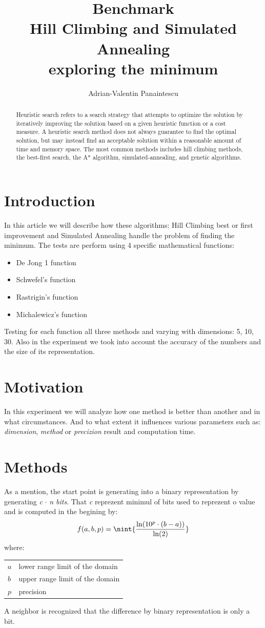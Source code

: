 \documentclass{article}
\author{Adrian-Valentin Panaintescu}
\title{Benchmark\\Hill Climbing and Simulated Annealing\\exploring the minimum}
\makeatletter
\newenvironment{conditions}
  {\par\vspace{\abovedisplayskip}\noindent\begin{tabular}{>{$}l<{$} @{${}={}$} l}}
  {\end{tabular}\par\vspace{\belowdisplayskip}}
\DeclarePairedDelimiter{\nint}\lfloor\rceil
\newcommand{\lnb}[1]{%
  \ln\mleft(#1\mright)%
}
\makeatother
\begin{document}
\maketitle
\begin{abstract}
    Heuristic search refers to a search strategy that attempts to optimize the solution by iteratively improving the solution based on a given heuristic function or a cost measure. A heuristic search method does not always guarantee to find the optimal solution, but may instead find an acceptable solution within a reasonable amount of time and memory space. The most common methods includes hill climbing methods, the best-first search, the A* algorithm, simulated-annealing, and genetic algorithms.
\end{abstract}
\section{Introduction}
    In this article we will describe how these algorithms: Hill Climbing best or first improvement and Simulated Annealing  handle the problem of finding the minimum. The tests are perform using 4 specific mathematical functions:
    \begin{itemize}
        \item De Jong 1 function
        \item Schwefel's function
        \item Rastrigin's function
        \item Michalewicz's function
    \end{itemize}
    Testing for each function all three methods and varying with dimensions: 5, 10, 30.
    Also in the experiment we took into account the accuracy of the numbers and the size of its representation. 
\section{Motivation}
    In this experiment we will analyze how one method is better than another and in what circumstances. And to what extent it influences various parameters such as: \textit{dimension}, \textit{method} or \textit{precizion} result and computation time.
\section{Methods}
    As a mention, the start point is generating into a binary representation by generating \textit{c} $\cdot$ \textit{n bits}. That \textit{c} reprezent minimul of bits used to reprezent o value and is computed in the begining by:
    \begin{equation}
        f(a,b,p) = \nint{\frac{ \lnb{ 10^p \cdot (b - a) }}{\lnb{2}}  }
    \end{equation}
    where:
    \begin{conditions}
        a   &  lower range limit of the domain\\
        b   &  upper range limit of the domain\\
        p   &  precision
    \end{conditions}
    A neighbor is recognized that the difference by binary representation is only a bit.
\end{document}
